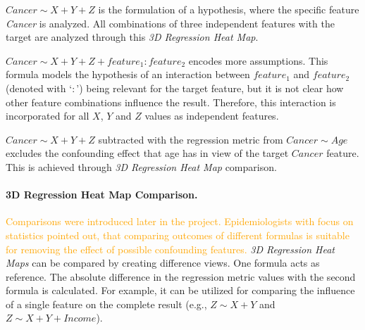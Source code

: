 \documentclass[journal]{style/vgtc} 			          %
\newcommand{\design}[1]{\textcolor{orange}{#1}}
\begin{document}
$Cancer \sim X + Y + Z$ is the formulation of a hypothesis, where the specific feature \textit{Cancer} is analyzed.
All combinations of three independent features with the target are analyzed through this \emph{3D Regression Heat Map}.

$Cancer \sim X + Y + Z + feature_1:feature_2$ encodes more assumptions.
This formula models the hypothesis of an interaction between $feature_1$ and $feature_2$ (denoted with `$:$') being relevant for the target feature, but it is not clear how other feature combinations influence the result.
Therefore, this interaction is incorporated for all $X$, $Y$ and $Z$ values as independent features.

$Cancer \sim X + Y + Z$ subtracted with the regression metric from $Cancer \sim Age$ excludes the confounding effect that age has in view of the target $Cancer$ feature.
This is achieved through \emph{3D Regression Heat Map} comparison.

\paragraph{3D Regression Heat Map Comparison.}
\design{
Comparisons were introduced later in the project.
Epidemiologists with focus on statistics pointed out, that comparing outcomes of different formulas is suitable for removing the effect of possible confounding features.
}
\emph{3D Regression Heat Maps} can be compared by creating difference views.
One formula acts as reference.
The absolute difference in the regression metric values with the second formula is calculated. %
For example, it can be utilized for comparing the influence of a single feature on the complete result (e.g., $Z \sim X + Y$ and $Z \sim X + Y + Income$).
\end{document}
